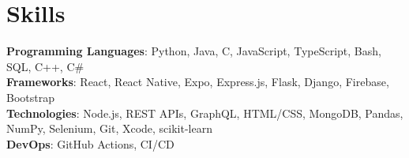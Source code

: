 \section{Skills}
    \begin{itemize}[leftmargin=0.15in, label={}]
	\small{\item{
		\textbf{Programming Languages}{: Python, Java, C, JavaScript, TypeScript, Bash, SQL, C++, C\#} \\
		\textbf{Frameworks}{: React, React Native, Expo, Express.js, Flask, Django, Firebase, Bootstrap} \\
		\textbf{Technologies}{: Node.js, REST APIs, GraphQL,  HTML/CSS, MongoDB, Pandas, NumPy, Selenium, Git, Xcode, scikit-learn} \\
		\textbf{DevOps}{: GitHub Actions, CI/CD} \\
	}}
    \end{itemize}

